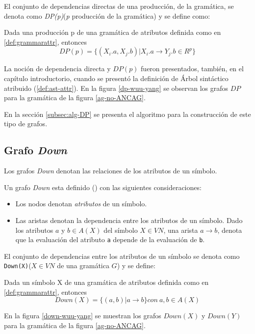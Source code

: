 El conjunto de dependencias directas de una producción, de la gramática, se denota como \textit{DP(p)}(\textit{p} producción de la gramática) y se define como:
\begin{definition}
Dada una producción p de una gramática de atributos definida como en \ref{def:grammarattr}, entonces
\begin{equation}
DP(p) = \{(X_{i}.a, X_{j}.b) | X_{i}.a \rightarrow Y_{j}.b \in R^{p} \}
\end{equation}
\end{definition}

La noción de dependencia directa y $DP(p)$ fueron presentados, también, en el capítulo introductorio, cuando se presentó la definición de Árbol sintáctico atribuido (\ref{def:ast-attr}).  
En la figura \ref{dp-wuu-yang} se observan los grafos $DP$ para la gramática de la figura \ref{ag-no-ANCAG}.

En la sección \ref{subsec:alg-DP} se presenta el algoritmo para la construcción de este tipo de grafos.

\subsection{Grafo \textit{Down}}
\label{subsec:graph-down-def}
Los grafos \textit{Down} denotan las relaciones de los atributos de un símbolo. 

Un grafo \textit{Down} esta definido (\cite{estruc-algorit}) con las siguientes consideraciones: 

\begin{itemize}
\item Los nodos denotan \textit{atributos} de un símbolo.
\item Las aristas denotan la dependencia entre los atributos de un símbolo. Dado los atributos $a$ y $b\in A(X)$ del símbolo $X\in VN$, una arista $a\rightarrow b$, denota que la evaluación del atributo \texttt{a} depende de la evaluación de \texttt{b}. 
\end{itemize}
El conjunto de dependencias entre los atributos de un símbolo se denota como  
\texttt{Down(X)}($X\in VN$ de una gramática $G$) y se define:
\begin{definition}
Dada un símbolo X de una gramática de atributos definida como en \ref{def:grammarattr}, entonces
\begin{equation}
Down(X) = \{(a,b) | a \rightarrow b \} con\ a,b \in A(X)
\end{equation}
\end{definition}
En la figura \ref{down-wuu-yang} se muestran los grafos $Down(X)$ y $Down(Y)$ para la gramática de la figura \ref{ag-no-ANCAG}.

